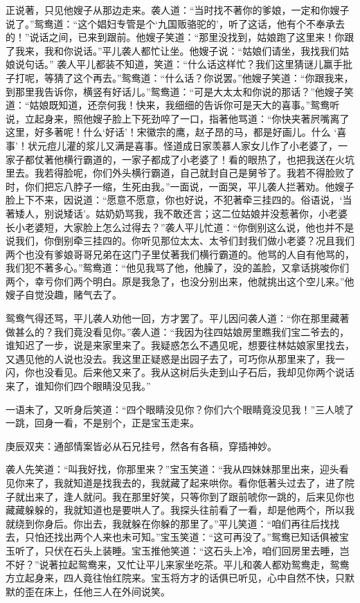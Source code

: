\begin{parag}
    正说著，只见他嫂子从那边走来。袭人道：“当时找不著你的爹娘，一定和你嫂子说了。”鸳鸯道：“这个娼妇专管是个‘九国贩骆驼的’，听了这话，他有个不奉承去的！”说话之间，已来到跟前。他嫂子笑道：“那里没找到，姑娘跑了这里来！你跟了我来，我和你说话。”平儿袭人都忙让坐。他嫂子说：“姑娘们请坐，我找我们姑娘说句话。” 袭人平儿都装不知道，笑道：“什么话这样忙？我们这里猜谜儿赢手批子打呢，等猜了这个再去。”鸳鸯道：“什么话？你说罢。”他嫂子笑道：“你跟我来，到那里我告诉你，横竖有好话儿。”鸳鸯道：“可是大太太和你说的那话？”他嫂子笑道：“姑娘既知道，还奈何我！快来，我细细的告诉你可是天大的喜事。”鸳鸯听说，立起身来，照他嫂子脸上下死劲啐了一口，指著他骂道：“你快夹著屄嘴离了这里，好多著呢！什么‘好话’！宋徽宗的鹰，赵子昂的马，都是好画儿。什么 ‘喜事’！状元痘儿灌的浆儿又满是喜事。怪道成日家羡慕人家女儿作了小老婆了，一家子都仗著他横行霸道的，一家子都成了小老婆了！看的眼热了，也把我送在火坑里去。我若得脸呢，你们外头横行霸道，自己就封自己是舅爷了。我若不得脸败了时，你们把忘八脖子一缩，生死由我。”一面说，一面哭，平儿袭人拦著劝。他嫂子脸上下不来，因说道：“愿意不愿意，你也好说，不犯著牵三挂四的。俗语说，‘当著矮人，别说矮话’。姑奶奶骂我，我不敢还言；这二位姑娘并没惹著你，小老婆长小老婆短，大家脸上怎么过得去？”袭人平儿忙道：“你倒别这么说，他也并不是说我们，你倒别牵三挂四的。你听见那位太太、太爷们封我们做小老婆？况且我们两个也没有爹娘哥哥兄弟在这门子里仗著我们横行霸道的。他骂的人自有他骂的，我们犯不著多心。”鸳鸯道：“他见我骂了他，他臊了，没的盖脸，又拿话挑唆你们两个，幸亏你们两个明白。原是我急了，也没分别出来，他就挑出这个空儿来。”他嫂子自觉没趣，赌气去了。
\end{parag}


\begin{parag}
    鸳鸯气得还骂，平儿袭人劝他一回，方才罢了。平儿因问袭人道：“你在那里藏著做甚么的？我们竟没看见你。”袭人道：“我因为往四姑娘房里瞧我们宝二爷去的，谁知迟了一步，说是来家里来了。我疑惑怎么不遇见呢，想要往林姑娘家里找去，又遇见他的人说也没去。我这里正疑惑是出园子去了，可巧你从那里来了，我一闪，你也没看见。后来他又来了。我从这树后头走到山子石后，我却见你两个说话来了，谁知你们四个眼睛没见我。”
\end{parag}


\begin{parag}
    一语未了，又听身后笑道：“四个眼睛没见你？你们六个眼睛竟没见我！”三人唬了一跳，回身一看，不是别个，正是宝玉走来。\begin{note}庚辰双夹：通部情案皆必从石兄挂号，然各有各稿，穿插神妙。\end{note}袭人先笑道：“叫我好找，你那里来？”宝玉笑道：“我从四妹妹那里出来，迎头看见你来了，我就知道是找我去的，我就藏了起来哄你。看你低著头过去了，进了院子就出来了，逢人就问。我在那里好笑，只等你到了跟前唬你一跳的，后来见你也藏藏躲躲的，我就知道也是要哄人了。我探头往前看了一看，却是他两个，所以我就绕到你身后。你出去，我就躲在你躲的那里了。”平儿笑道：“咱们再往后找找去，只怕还找出两个人来也未可知。”宝玉笑道：“这可再没了。”鸳鸯已知话俱被宝玉听了，只伏在石头上装睡。宝玉推他笑道：“这石头上冷，咱们回房里去睡，岂不好？”说著拉起鸳鸯来，又忙让平儿来家坐吃茶。平儿和袭人都劝鸳鸯走，鸳鸯方立起身来，四人竟往怡红院来。宝玉将方才的话俱已听见，心中自然不快，只默默的歪在床上，任他三人在外间说笑。
\end{parag}


